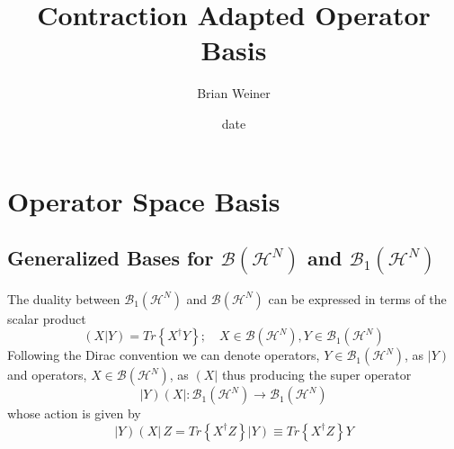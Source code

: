 \documentclass[aps,preprint]{revtex4}%
\begin{document}
\preprint{ }
\title[Adapted Operator Basis]{Contraction Adapted Operator Basis}
\author{Brian Weiner}
\keywords{}
\pacs{}

\begin{abstract}


\end{abstract}
\date[Date text]{date}
\tableofcontents


\section{Operator Space Basis}

\subsection{Generalized Bases for $\mathcal{B}\left(  \mathcal{H}^{N}\right)
$ and $\mathcal{B}_{1}\left(  \mathcal{H}^{N}\right)  $}

The duality between $\mathcal{B}_{1}\left(  \mathcal{H}^{N}\right)  $ and
$\mathcal{B}\left(  \mathcal{H}^{N}\right)  $ can be expressed in terms of the
scalar product
\begin{equation}
\left(  X|Y\right)  =Tr\left\{  X^{\dagger}Y\right\}  ;\quad X\in
\mathcal{B}\left(  \mathcal{H}^{N}\right)  ,Y\in\mathcal{B}_{1}\left(
\mathcal{H}^{N}\right)
\end{equation}
Following the Dirac convention we can denote operators, $Y\in\mathcal{B}%
_{1}\left(  \mathcal{H}^{N}\right)  $, as $\left\vert Y\right)  $ and
operators, $X\in\mathcal{B}\left(  \mathcal{H}^{N}\right)  $, as $\left(
X\right\vert $ thus producing the super operator%
\begin{equation}
\left\vert Y\right)  \left(  X\right\vert :\mathcal{B}_{1}\left(
\mathcal{H}^{N}\right)  \rightarrow\mathcal{B}_{1}\left(  \mathcal{H}%
^{N}\right)
\end{equation}
whose action is given by
\begin{equation}
\left\vert Y\right)  \left(  X\right\vert \,Z=Tr\left\{  X^{\dagger}Z\right\}
\left\vert Y\right)  \equiv Tr\left\{  X^{\dagger}Z\right\}  Y
\end{equation}
\end{document}
